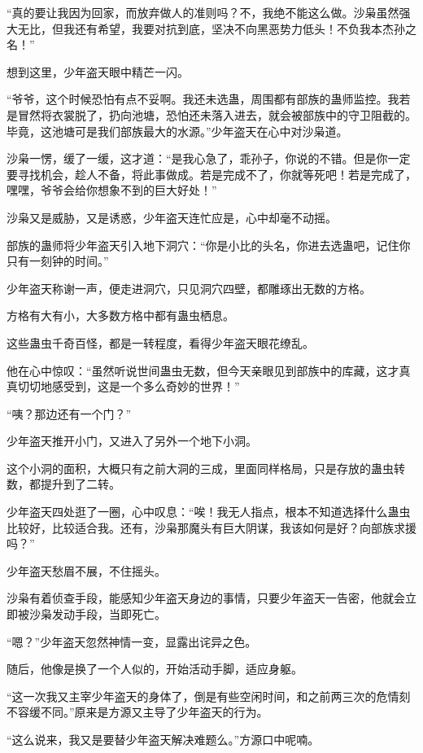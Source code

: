 \begin{this_body}
“真的要让我因为回家，而放弃做人的准则吗？不，我绝不能这么做。沙枭虽然强大无比，但我还有希望，我要对抗到底，坚决不向黑恶势力低头！不负我本杰孙之名！”

想到这里，少年盗天眼中精芒一闪。

“爷爷，这个时候恐怕有点不妥啊。我还未选蛊，周围都有部族的蛊师监控。我若是冒然将衣裳脱了，扔向池塘，恐怕还未落入进去，就会被部族中的守卫阻截的。毕竟，这池塘可是我们部族最大的水源。”少年盗天在心中对沙枭道。

沙枭一愣，缓了一缓，这才道：“是我心急了，乖孙子，你说的不错。但是你一定要寻找机会，趁人不备，将此事做成。若是完成不了，你就等死吧！若是完成了，嘿嘿，爷爷会给你想象不到的巨大好处！”

沙枭又是威胁，又是诱惑，少年盗天连忙应是，心中却毫不动摇。

部族的蛊师将少年盗天引入地下洞穴：“你是小比的头名，你进去选蛊吧，记住你只有一刻钟的时间。”

少年盗天称谢一声，便走进洞穴，只见洞穴四壁，都雕琢出无数的方格。

方格有大有小，大多数方格中都有蛊虫栖息。

这些蛊虫千奇百怪，都是一转程度，看得少年盗天眼花缭乱。

他在心中惊叹：“虽然听说世间蛊虫无数，但今天亲眼见到部族中的库藏，这才真真切切地感受到，这是一个多么奇妙的世界！”

“咦？那边还有一个门？”

少年盗天推开小门，又进入了另外一个地下小洞。

这个小洞的面积，大概只有之前大洞的三成，里面同样格局，只是存放的蛊虫转数，都提升到了二转。

少年盗天四处逛了一圈，心中叹息：“唉！我无人指点，根本不知道选择什么蛊虫比较好，比较适合我。还有，沙枭那魔头有巨大阴谋，我该如何是好？向部族求援吗？”

少年盗天愁眉不展，不住摇头。

沙枭有着侦查手段，能感知少年盗天身边的事情，只要少年盗天一告密，他就会立即被沙枭发动手段，当即死亡。

“嗯？”少年盗天忽然神情一变，显露出诧异之色。

随后，他像是换了一个人似的，开始活动手脚，适应身躯。

“这一次我又主宰少年盗天的身体了，倒是有些空闲时间，和之前两三次的危情刻不容缓不同。”原来是方源又主导了少年盗天的行为。

“这么说来，我又是要替少年盗天解决难题么。”方源口中呢喃。


\end{this_body}
